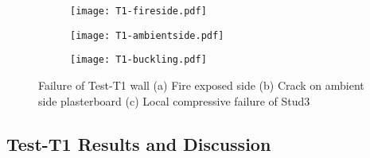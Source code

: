 \begin{figure}[!htbp]
	\centering
	\begin{subfigure}[b]{0.4\textwidth}
		\centering
		\texttt{[image: T1-fireside.pdf]}
		\caption{}
		\label{subfig:T1-fireside}
	\end{subfigure}
	\begin{subfigure}[b]{0.4\textwidth}
		\centering
		\texttt{[image: T1-ambientside.pdf]}
		\caption{}
		\label{subfig:T1-ambientside}
	\end{subfigure}
	\begin{subfigure}[b]{0.4\textwidth}
		\centering
		\texttt{[image: T1-buckling.pdf]}
		\caption{}
		\label{subfig:T1-buckling}
	\end{subfigure}
	   \caption{Failure of Test-T1 wall (a) Fire exposed side (b) Crack on ambient side plasterboard (c) Local compressive failure of Stud3}
	   \label{fig:T1-failure}
\end{figure}

\subsection{Test-T1 Results and Discussion}

